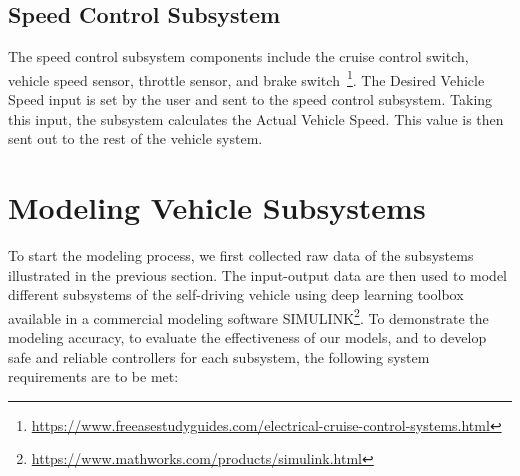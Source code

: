 \documentclass[conference]{IEEEtran}
\begin{document}
  \subsection{Speed Control Subsystem}
  The speed control subsystem components include the cruise control switch, vehicle speed sensor, throttle sensor, and brake switch~\footnote{\url{https://www.freeasestudyguides.com/electrical-cruise-control-systems.html}}. %
  The Desired Vehicle Speed input is set by the user and sent to the speed control subsystem. Taking this input, the subsystem calculates the Actual Vehicle Speed. This value is then sent out to the rest of the vehicle system.



\section{Modeling Vehicle Subsystems}

To start the modeling process, we first collected raw data of the subsystems illustrated in the previous section. The input-output data are then used to model different subsystems of the self-driving vehicle using deep learning toolbox available in a commercial modeling software SIMULINK\footnote{\url{https://www.mathworks.com/products/simulink.html}}. To demonstrate the modeling accuracy, to evaluate the effectiveness of our models, and to develop safe and reliable controllers for each subsystem, the following system requirements are to be met:
\end{document}
